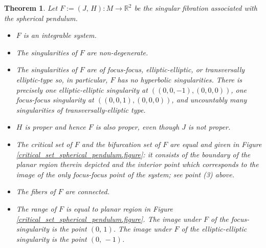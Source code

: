 \documentclass[11pt]{article}
\newtheorem{theorem}{Theorem}[section]
\newcommand{\R}{{\mathbb R}}
\begin{document}
\begin{theorem}
  \label{sphericalpendulum:theorem}
  Let $F:=(J,\,H) \colon M \to \R^2$ be the singular fibration
  associated with the spherical pendulum.
  \begin{itemize}
  \item[{\rm (1)}] $F$ is an integrable system.
  \item[{\rm (2)}] The singularities of $F$ are non\--degenerate.
  \item[{\rm (3)}] The singularities of $F$ are of focus-focus,
    elliptic-elliptic, or transversally elliptic-type so, in
    particular, $F$ has no hyperbolic singularities.  There is
    precisely one elliptic-elliptic singularity at
    $((0,0,-1),(0,0,0))$, one focus-focus singularity at
    $((0,0,1),(0,0,0))$, and uncountably many singularities of
    transversally-elliptic type.
  \item[{\rm (4)}] $H$ is proper and hence $F$ is also proper, even
    though $J$ is \emph{not} proper.
  \item[{\rm (5)}] The critical set of $F$ and the bifurcation set of
    $F$ are equal and given in Figure
    \ref{critical_set_spherical_pendulum.figure}: it consists of the
    boundary of the planar region therein depicted and the interior
    point which corresponds to the image of the only focus-focus point
    of the system; see point (3) above.
  \item[{\rm (6)}] The fibers of $F$ are connected.
  \item[{\rm (7)}] The range of $F$ is equal to planar region in
    Figure \ref{critical_set_spherical_pendulum.figure}. The image
    under $F$ of the focus-singularity is the point $(0,\,1)$.  The
    image under $F$ of the elliptic-elliptic singularity is the point
    $(0,\,-1)$.
  \end{itemize}
\end{theorem}
\end{document}
